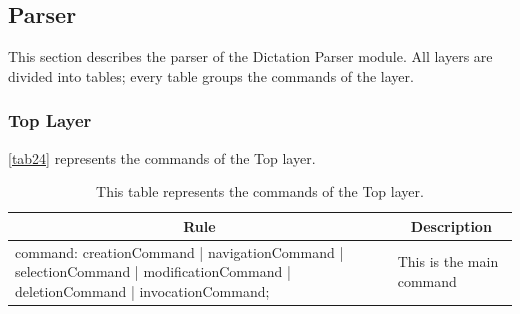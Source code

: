 \subsection{Parser}
This section describes the parser of the Dictation Parser module. All layers are divided into tables; every table groups the commands of the layer.

\subsubsection{Top Layer}
\autoref{tab24} represents the commands of the Top layer.
\begin{table}[H]
	\centering
	\begin{tabular}{|p{8cm}|p{7cm}|}
		\hline
		\multicolumn{1}{|c|}{{\bf Rule}}                                                                                             & \multicolumn{1}{c|}{{\bf Description}} \\ \hline
		command: creationCommand | navigationCommand | selectionCommand | modificationCommand | deletionCommand | invocationCommand; & This is the main command               \\ \hline
	\end{tabular}
	\caption{This table represents the commands of the Top layer.}
	\label{tab24}
\end{table}

